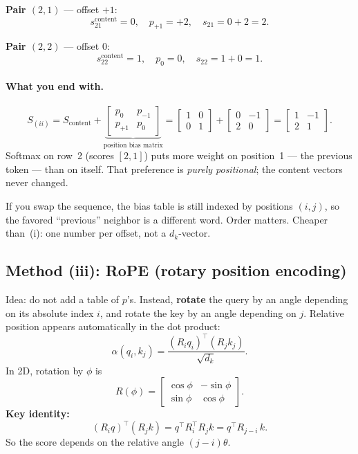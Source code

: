 \documentclass[11pt]{article}
\begin{document}
\textbf{Pair \((2,1)\)} --- offset \(+1\):
\[
  s^{\text{content}}_{21}=0,\quad
  p_{+1}=+2,\quad
  s_{21}=0+2=2.
\]

\textbf{Pair \((2,2)\)} --- offset \(0\):
\[
  s^{\text{content}}_{22}=1,\quad
  p_{0}=0,\quad
  s_{22}=1+0=1.
\]

\paragraph{What you end with.}
\[
  S_{(ii)}
  =
  S_{\text{content}}
  +
  \underbrace{\begin{bmatrix}
    p_{0} & p_{-1} \\
    p_{+1} & p_{0}
  \end{bmatrix}}_{\text{position bias matrix}}
  =
  \begin{bmatrix}1&0\\0&1\end{bmatrix}
  +
  \begin{bmatrix}0&-1\\2&0\end{bmatrix}
  =
  \begin{bmatrix}1&-1\\2&1\end{bmatrix}.
\]
Softmax on row~2 (scores \([2,1]\)) puts more weight on position~1 --- the
previous token --- than on itself. That preference is \emph{purely
positional}; the content vectors never changed.

If you swap the sequence, the bias table is still indexed by positions
\((i,j)\), so the favored ``previous'' neighbor is a different word. Order
matters. Cheaper than~(i): one number per offset, not a \(d_k\)-vector.

\subsection{Method (iii): RoPE (rotary position encoding)}

Idea: do not add a table of \(p\)'s. Instead, \textbf{rotate} the query by
an angle depending on its absolute index \(i\), and rotate the key by an
angle depending on \(j\). Relative position appears automatically in the
dot product:
\[
  \alpha(q_i,k_j)
  =
  \frac{(R_i q_i)^\top (R_j k_j)}{\sqrt{d_k}}.
\]
In 2D, rotation by \(\phi\) is
\[
  R(\phi)
  =
  \begin{bmatrix}
    \cos\phi & -\sin\phi \\
    \sin\phi & \cos\phi
  \end{bmatrix}.
\]
\textbf{Key identity:}
\[
  (R_i q)^\top (R_j k)
  =
  q^\top R_i^\top R_j k
  =
  q^\top R_{j-i}\, k.
\]
So the score depends on the relative angle \((j-i)\theta\).
\end{document}
